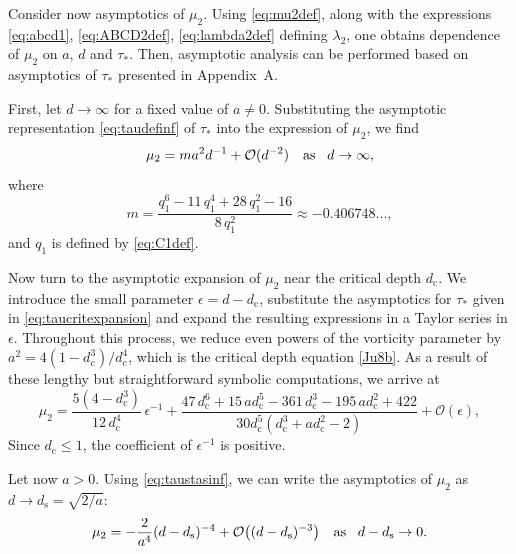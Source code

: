 \documentclass[oneside,a4paper,11pt]{article}
\theoremstyle{thmstyletwo}%
\theoremstyle{thmstylethree}%
\numberwithin{equation}{section}
\def\dcrit{d_{\textrm{c}}}
\def\ds{d_{\textrm{s}}}
\def\taust{\tau_{*}}
\def\Obig{\mathcal{O}}
\begin{document}
Consider now asymptotics of $\mu_2$. Using \eqref{eq:mu2def}, along with the expressions \eqref{eq:abcd1}, \eqref{eq:ABCD2def}, \eqref{eq:lambda2def} defining $\lambda_2$, one obtains dependence of $\mu_2$ on $a$, $d$ and $\taust$. Then, asymptotic analysis can be performed based on asymptotics of $\taust$ presented in Appendix~A.

First, let \mbox{$d\to\infty$} for a fixed value of \mbox{$a\neq0$}. Substituting the asymptotic representation \eqref{eq:taudefinf} of $\taust$  into the expression of $\mu_2$, we find
\begin{equation}
\mu_2 = m a^2 d^{-1}+\Obig(d^{-2})\quad\mbox{as\!}\quad d\to\infty,
\label{eq:mu2as_d_large}
\end{equation}
where
\begin{equation}
m=\frac{q_1^6-11\,q_1^4+28\, q_1^2-16}{8\,q_1^2}\approx -0.406748...,\label{eq:m1}
\end{equation}
and $q_1$ is defined by \eqref{eq:C1def}.

Now turn to the asymptotic expansion of $\mu_2$ near the critical depth $\dcrit$. We introduce the small parameter $\epsilon = d - \dcrit$, substitute the asymptotics for $\taust$ given in \eqref{eq:taucritexpansion} and expand the resulting expressions in a Taylor series in $\epsilon$. Throughout this process, we reduce even powers of the vorticity parameter by $a^{2} = 4(1-d_c^3)/d_c^4$, which is the critical depth equation \eqref{Ju8b}. As a result of these lengthy but straightforward symbolic computations, we arrive at
\begin{equation}
\mu_2=
\frac{5(4-\dcrit^3)}{12\,\dcrit^4}\,\epsilon^{-1}+
\frac{47\,\dcrit^6+15\,a\dcrit^5-361\,\dcrit^3-195\,a\dcrit^2+422}{30\dcrit^5(\dcrit^3+a\dcrit^2-2)}
+
\Obig(\epsilon),
\label{eq:mu2as_dcrit}
\end{equation}
Since $\dcrit\leq 1$, the coefficient of $\epsilon^{-1}$ is positive.

Let now $a>0$. Using \eqref{eq:taustasinf}, we can write the asymptotics of $\mu_2$ as $d\to \ds=\sqrt{2/a}$:
\begin{equation}
\mu_2=
-\frac{2}{a^4}(d-\ds)^{-4}+\Obig\bigl((d-\ds)^{-3}\bigr)\quad \mbox{as\!}\quad d-\ds\to0.
\label{eq:mu2as_ds}
\end{equation}

\end{document}
